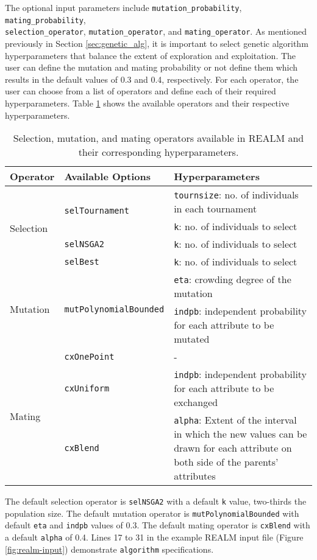 The optional input parameters include \texttt{mutation\_probability}, 
\texttt{mating\_probability}, \\ \texttt{selection\_operator}, 
\texttt{mutation\_operator}, and \texttt{mating\_operator}. 
As mentioned previously in Section \ref{sec:genetic_alg}, it is important to 
select genetic algorithm hyperparameters that balance the extent of exploration 
and exploitation.
The user can define the mutation and mating probability or not define them which 
results in the default values of 0.3 and 0.4, respectively. 
For each operator, the user can choose from a list of operators and define each
of their required hyperparameters. 
Table \ref{tab:deap_operators} shows the available operators and their respective 
hyperparameters. 
\begin{table}[]
    \centering
    \onehalfspacing
    \caption{Selection, mutation, and mating operators available in 
    \acrfull{REALM} and their corresponding hyperparameters. }
	\label{tab:deap_operators}
    \footnotesize
    \begin{tabular}{l|p{}|p{}}
    \hline
    \textbf{Operator} & \textbf{Available Options} & \textbf{Hyperparameters} \\ \hline
    \multirow{4}{1cm}{Selection} & \multirow{2}{2cm}{\texttt{selTournament}} & \texttt{tournsize}: no. of individuals in each tournament\\ 
    & & \texttt{k}: no. of individuals to select \\ \cline{2-3}
    & \texttt{selNSGA2} & \texttt{k}: no. of individuals to select\\ \cline{2-3}
    & \texttt{selBest} & \texttt{k}: no. of individuals to select\\ \hline
    \multirow{2}{1cm}{Mutation} & \multirow{2}{2cm}{\texttt{mutPolynomialBounded}} & \texttt{eta}: crowding degree of the mutation\\  
    && \texttt{indpb}: independent probability for each attribute to be mutated\\ \hline
    \multirow{3}{1cm}{Mating} & \texttt{cxOnePoint} & -\\ \cline{2-3}
    & \texttt{cxUniform} & \texttt{indpb}: independent probability for each attribute to be exchanged\\ \cline{2-3}
    & \texttt{cxBlend} & \texttt{alpha}: Extent of the interval in which the new values can be drawn for each attribute on both side of the parents’ attributes\\ \hline
    \end{tabular}
    \end{table}
The default selection operator is \texttt{selNSGA2} with a default
\texttt{k} value, two-thirds the population size. 
The default mutation operator is \texttt{mutPolynomialBounded} with default
\texttt{eta} and \texttt{indpb} values of 0.3. 
The default mating operator is \texttt{cxBlend} with a default \texttt{alpha} 
of 0.4. 
Lines 17 to 31 in the example \gls{REALM} input file (Figure \ref{fig:realm-input}) 
demonstrate \texttt{algorithm} specifications. 

